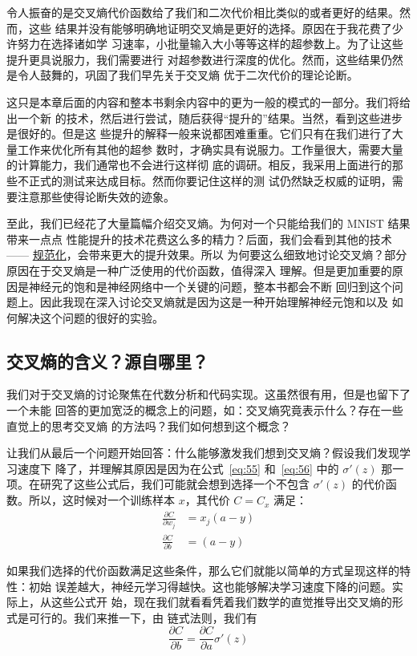 令人振奋的是交叉熵代价函数给了我们和二次代价相比类似的或者更好的结果。然而，这些
结果并没有能够明确地证明交叉熵是更好的选择。原因在于我花费了少许努力在选择诸如学
习速率，小批量输入大小等等这样的超参数上。为了让这些提升更具说服力，我们需要进行
对超参数进行深度的优化。然而，这些结果仍然是令人鼓舞的，巩固了我们早先关于交叉熵
优于二次代价的理论论断。

这只是本章后面的内容和整本书剩余内容中的更为一般的模式的一部分。我们将给出一个新
的技术，然后进行尝试，随后获得``提升的''结果。当然，看到这些进步是很好的。但是这
些提升的解释一般来说都困难重重。它们只有在我们进行了大量工作来优化所有其他的超参
数时，才确实具有说服力。工作量很大，需要大量的计算能力，我们通常也不会进行这样彻
底的调研。相反，我采用上面进行的那些不正式的测试来达成目标。然而你要记住这样的测
试仍然缺乏权威的证明，需要注意那些使得论断失效的迹象。

至此，我们已经花了大量篇幅介绍交叉熵。为何对一个只能给我们的 MNIST 结果带来一点点
性能提升的技术花费这么多的精力？后面，我们会看到其他的技术 ——
\hyperref[sec:overfitting_and_regularization]{规范化}，会带来更大的提升效果。所以
为何要这么细致地讨论交叉熵？部分原因在于交叉熵是一种广泛使用的代价函数，值得深入
理解。但是更加重要的原因是神经元的饱和是神经网络中一个关键的问题，整本书都会不断
回归到这个问题上。因此我现在深入讨论交叉熵就是因为这是一种开始理解神经元饱和以及
如何解决这个问题的很好的实验。

\subsection{交叉熵的含义？源自哪里？}

我们对于交叉熵的讨论聚焦在代数分析和代码实现。这虽然很有用，但是也留下了一个未能
回答的更加宽泛的概念上的问题，如：交叉熵究竟表示什么？存在一些直觉上的思考交叉熵
的方法吗？我们如何想到这个概念？

让我们从最后一个问题开始回答：什么能够激发我们想到交叉熵？假设我们发现学习速度下
降了，并理解其原因是因为在公式~\eqref{eq:55} 和~\eqref{eq:56} 中的 $\sigma'(z)$
那一项。在研究了这些公式后，我们可能就会想到选择一个不包含 $\sigma'(z)$ 的代价函
数。所以，这时候对一个训练样本 $x$，其代价 $C = C_x$ 满足：
\begin{align}
  \frac{\partial C}{\partial w_j} &= x_j(a-y) \label{eq:71}\tag{71}\\
  \frac{\partial C}{\partial b } &= (a-y) \label{eq:72}\tag{72}
\end{align}

如果我们选择的代价函数满足这些条件，那么它们就能以简单的方式呈现这样的特性：初始
误差越大，神经元学习得越快。这也能够解决学习速度下降的问题。实际上，从这些公式开
始，现在我们就看看凭着我们数学的直觉推导出交叉熵的形式是可行的。我们来推一下，由
链式法则，我们有
\begin{equation}
  \frac{\partial C}{\partial b} = \frac{\partial C}{\partial a}
  \sigma'(z)
  \tag{73}
\end{equation}

